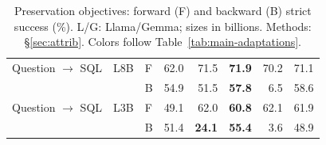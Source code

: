 \begin{table}[!t]
\begin{tabular}{lllrrrrr}
\addlinespace[2pt]
Question $\to$ SQL & L8B & F & 62.0 & 71.5 & \textcolor{blue!60!black}{\textbf{71.9}} & 70.2 & 71.1 \\
 &  & B & 54.9 & 51.5 & \textcolor{blue!60!black}{\textbf{57.8}} & 6.5 & 58.6 \\
\addlinespace[2pt]
Question $\to$ SQL & L3B & F & 49.1 & 62.0 & \textcolor{blue!60!black}{\textbf{60.8}} & 62.1 & 61.9 \\
 &  & B & 51.4 & \textcolor{red!70!black}{\textbf{24.1}} & \textcolor{blue!60!black}{\textbf{55.4}} & 3.6 & 48.9 \\
\bottomrule
\end{tabular}
\caption{Preservation objectives: forward (F) and backward (B) strict success (\%). L/G: Llama/Gemma; sizes in billions. Methods: \S\ref{sec:attrib}. Colors follow Table~\ref{tab:main-adaptations}.}\label{tab:main-loss-baselines}
\end{table}
